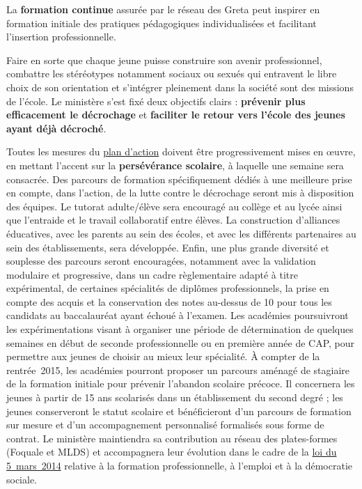La \textbf{formation continue} assurée par le réseau des Greta peut inspirer en formation initiale des pratiques pédagogiques individualisées et facilitant l’insertion professionnelle.

Faire en sorte que chaque jeune puisse construire son avenir professionnel, combattre les stéréotypes notamment sociaux ou sexués qui entravent le libre choix de son orientation et s’intégrer pleinement dans la société sont des missions de l’école. Le ministère s’est fixé deux objectifs clairs : \textbf{prévenir plus efficacement le décrochage} et \textbf{faciliter le retour vers l’école des jeunes ayant déjà décroché}.

Toutes les mesures du \href{http://www.education.gouv.fr/cid84031/tous-mobilises-pour-vaincre-le-decrochage-scolaire.html#Le_d\%C3\%A9tail\%20du\%20plan\%20de\%20lutte\%20contre\%20le\%20d\%C3\%A9crochage}{plan d’action} doivent être progressivement mises en œuvre, en mettant l’accent sur la \textbf{persévérance scolaire}, à laquelle une semaine sera consacrée. Des parcours de formation spécifiquement dédiés à une meilleure prise en compte, dans l’action, de la lutte contre le décrochage seront mis à disposition des équipes. Le tutorat adulte/élève sera encouragé au collège et au lycée ainsi que l’entraide et le travail collaboratif entre élèves. La construction d’alliances éducatives, avec les parents au sein des écoles, et avec les différents partenaires au sein des établissements, sera développée. Enfin, une plus grande diversité et souplesse des parcours seront encouragées, notamment avec la validation modulaire et progressive, dans un cadre règlementaire adapté à titre expérimental, de certaines spécialités de diplômes professionnels, la prise en compte des acquis et la conservation des notes au-dessus de 10 pour tous les candidats au baccalauréat ayant échoué à l’examen. Les académies poursuivront les expérimentations visant à organiser une période de détermination de quelques semaines en début de seconde professionnelle ou en première année de CAP, pour permettre aux jeunes de choisir au mieux leur spécialité. À compter de la rentrée~2015, les académies pourront proposer un parcours aménagé de \og stagiaire de la formation initiale \fg{} pour prévenir l’abandon scolaire précoce. Il concernera les jeunes à partir de 15 ans scolarisés dans un établissement du second degré ; les jeunes conserveront le statut scolaire et bénéficieront d’un parcours de formation \og sur mesure \fg{} et d’un accompagnement personnalisé formalisés sous forme de contrat. Le ministère maintiendra sa contribution au réseau des plates-formes (Foquale et MLDS) et accompagnera leur évolution dans le cadre de la \href{http://www.legifrance.gouv.fr/affichTexte.do?cidTexte=JORFTEXT000028683576}{loi du 5~mars~2014} relative à la formation professionnelle, à l’emploi et à la démocratie sociale.

